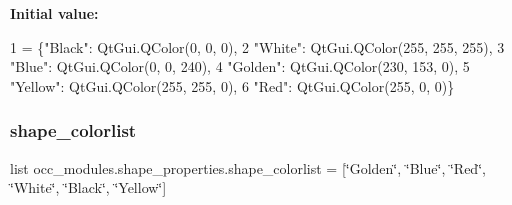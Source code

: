 {\bfseries Initial value\+:}
\begin{DoxyCode}
1 =  \{\textcolor{stringliteral}{"Black"}: QtGui.QColor(0, 0, 0),
2                             \textcolor{stringliteral}{"White"}: QtGui.QColor(255, 255, 255),
3                             \textcolor{stringliteral}{"Blue"}: QtGui.QColor(0, 0, 240),
4                             \textcolor{stringliteral}{"Golden"}: QtGui.QColor(230, 153, 0),
5                             \textcolor{stringliteral}{"Yellow"}: QtGui.QColor(255, 255, 0),
6                             \textcolor{stringliteral}{"Red"}: QtGui.QColor(255, 0, 0)\}
\end{DoxyCode}
\hypertarget{namespaceocc__modules_1_1shape__properties_ad2dbba5d4e06c2ef16d74722e24325bb}{}\label{namespaceocc__modules_1_1shape__properties_ad2dbba5d4e06c2ef16d74722e24325bb} 
\subsubsection{\texorpdfstring{shape\+\_\+colorlist}{shape\_colorlist}}
{\footnotesize\ttfamily list occ\+\_\+modules.\+shape\+\_\+properties.\+shape\+\_\+colorlist = \mbox{[}\char`\"{}Golden\char`\"{}, \char`\"{}Blue\char`\"{}, \char`\"{}Red\char`\"{}, \char`\"{}White\char`\"{}, \char`\"{}Black\char`\"{}, \char`\"{}Yellow\char`\"{}\mbox{]}}

